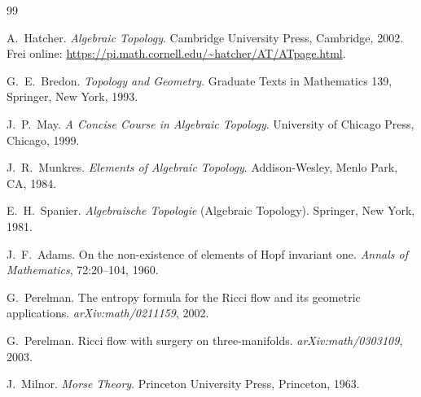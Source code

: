 \documentclass[12pt,a4paper]{amsart}
\theoremstyle{definition}
\begin{document}
\begin{thebibliography}{99}

A.~Hatcher.
\newblock \textit{Algebraic Topology}.
\newblock Cambridge University Press, Cambridge, 2002.
\newblock Frei online: \url{https://pi.math.cornell.edu/~hatcher/AT/ATpage.html}.

G.~E.~Bredon.
\newblock \textit{Topology and Geometry}.
\newblock Graduate Texts in Mathematics 139, Springer, New York, 1993.

J.~P.~May.
\newblock \textit{A Concise Course in Algebraic Topology}.
\newblock University of Chicago Press, Chicago, 1999.

J.~R.~Munkres.
\newblock \textit{Elements of Algebraic Topology}.
\newblock Addison-Wesley, Menlo Park, CA, 1984.

E.~H.~Spanier.
\newblock \textit{Algebraische Topologie} (Algebraic Topology).
\newblock Springer, New York, 1981.

J.~F.~Adams.
\newblock On the non-existence of elements of Hopf invariant one.
\newblock \textit{Annals of Mathematics}, 72:20--104, 1960.

G.~Perelman.
\newblock The entropy formula for the Ricci flow and its geometric applications.
\newblock \textit{arXiv:math/0211159}, 2002.

G.~Perelman.
\newblock Ricci flow with surgery on three-manifolds.
\newblock \textit{arXiv:math/0303109}, 2003.

J.~Milnor.
\newblock \textit{Morse Theory}.
\newblock Princeton University Press, Princeton, 1963.

\end{thebibliography}
\end{document}
